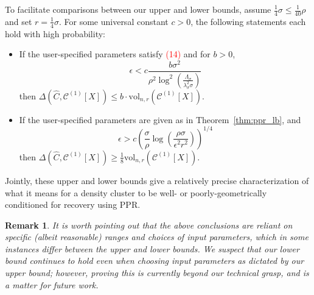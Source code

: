 \documentclass[11pt,twoside]{article}
\newtheorem*{remark}{Remark}
\newcommand{\vol}{\mathrm{vol}}
\newcommand{\1}{\mathbf{1}}
\newcommand{\Xbf}{X}             %
\begin{document}
To facilitate comparisons between our upper and lower bounds, assume $\frac{1}{4}\sigma \leq \frac{1}{40}\rho$ and set $r = \frac{1}{4}\sigma$. 
For some universal constant $c > 0$, the following statements each hold with high probability:
\begin{itemize}
\item If the user-specified parameters satisfy \textcolor{red}{(14)} and for $b > 0$,
\begin{equation*}
\epsilon < c\frac{b\sigma^2}{\rho^2 \log^2\left(\frac{\Lambda_{\sigma}}{\lambda_{\sigma}^2\sigma}\right)}
\end{equation*}
then $\Delta(\widehat{C}, \mathcal{C}^{(1)}[\Xbf]) \leq b \cdot  \vol_{n,r}(\mathcal{C}^{(1)}[\Xbf])$.
\item If the user-specified parameters are given as in Theorem~\ref{thm:ppr_lb}, and 
\begin{equation*}
\epsilon > c\left({\frac{\sigma}{\rho}} \log\left(\frac{\rho \sigma}{\epsilon^2 r^2}\right)\right)^{1/4}
\end{equation*}
then $\Delta(\widehat{C}, \mathcal{C}^{(1)}[\Xbf]) \geq \frac{1}{8} \vol_{n,r}(\mathcal{C}^{(1)}[\Xbf])$.
\end{itemize}

Jointly, these upper and lower bounds give a relatively precise characterization of what it means for a density cluster to be well- or poorly-geometrically conditioned for recovery using PPR.

\begin{remark}
	It is worth pointing out that the above conclusions are reliant on specific (albeit reasonable) ranges and choices of input parameters, which in some instances differ between the upper and lower bounds. We suspect that our lower bound continues to hold even when choosing input parameters as dictated by our upper bound; however, proving this is currently beyond our technical grasp, and is a matter for future work. 
\end{remark}
\end{document}
